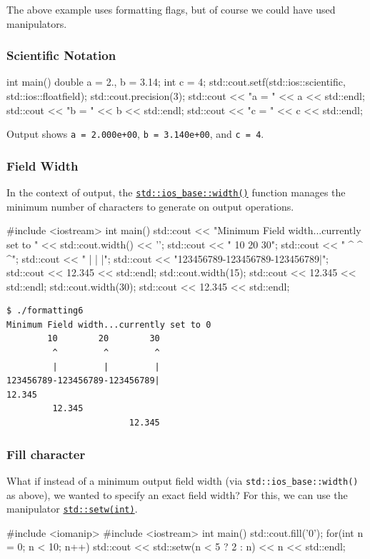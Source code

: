 \documentclass[12pt,letterpaper,twoside]{article}
\begin{document}
The above example uses formatting flags, but of course we could have used manipulators.
\subsubsection{Scientific Notation}
\begin{cpp}
int main() {
  double a = 2., b = 3.14;
  int c = 4;
  std::cout.setf(std::ios::scientific, std::ios::floatfield);
  std::cout.precision(3);
  std::cout << "a = " << a << std::endl;
  std::cout << "b = " << b << std::endl;
  std::cout << "c = " << c << std::endl;
}
\end{cpp}
Output shows \texttt{a = 2.000e+00}, \texttt{b = 3.140e+00}, and \texttt{c = 4}.

\subsubsection{Field Width}
In the context of output, the 
\href{https://en.cppreference.com/w/cpp/io/ios_base/width}{\texttt{std::ios\_base::width()}}
function manages the minimum number of characters to generate on output operations.
\begin{cpp}
#include <iostream>
int main() {
  std::cout << "Minimum Field width...currently set to " <<  std::cout.width() << '\n';
  std::cout << "        10        20        30\n";  
  std::cout << "         ^         ^         ^\n";
  std::cout << "         |         |         |\n";
  std::cout << "123456789-123456789-123456789|\n";
  std::cout << 12.345 << std::endl;
  std::cout.width(15);
  std::cout << 12.345 << std::endl;
  std::cout.width(30);
  std::cout << 12.345 << std::endl;
}
\end{cpp}

{\small
\begin{verbatim}
$ ./formatting6
Minimum Field width...currently set to 0
        10        20        30
         ^         ^         ^
         |         |         |
123456789-123456789-123456789|
12.345
         12.345
                        12.345
\end{verbatim}
}

\subsubsection{Fill character}
What if instead of a minimum output field width (via \texttt{std::ios\_base::width()} 
as above), we wanted to specify an exact field width? For this, we can use 
the manipulator \href{https://en.cppreference.com/w/cpp/io/manip/setw}
{\texttt{std::setw(int)}}.
\begin{cpp}
#include <iomanip>
#include <iostream>
 int main() {
  std::cout.fill('0');
  for(int n = 0; n < 10; n++)
    std::cout << std::setw(n < 5 ? 2 : n) << n << std::endl;
}
\end{cpp}
\end{document}
